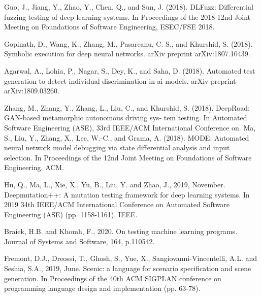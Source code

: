 \begin{singlespace}
\begin{thebibliography}{}
 Guo, J., Jiang, Y., Zhao, Y., Chen, Q., and Sun, J. (2018). DLFuzz: Differential fuzzing testing of deep learning systems. In Proceedings of the 2018 12nd Joint Meeting on Foundations of Software Engineering, ESEC/FSE 2018.

 Gopinath, D., Wang, K., Zhang, M., Pasareanu, C. S., and Khurshid, S. (2018). Symbolic execution for deep neural networks. arXiv preprint arXiv:1807.10439.

 Agarwal, A., Lohia, P., Nagar, S., Dey, K., and Saha, D. (2018). Automated test generation to detect individual discrimination in ai
models. arXiv preprint arXiv:1809.03260.

 Zhang, M., Zhang, Y., Zhang, L., Liu, C., and Khurshid, S. (2018). DeepRoad: GAN-based metamorphic autonomous driving sys- tem testing. In Automated Software Engineering (ASE), 33rd IEEE/ACM International Conference on.
 Ma, S., Liu, Y., Zhang, X., Lee, W.-C., and Grama, A. (2018). MODE: Automated neural network model debugging via state differential analysis and input selection. In Proceedings of the 12nd Joint Meeting on Foundations of Software Engineering. ACM.

Hu, Q., Ma, L., Xie, X., Yu, B., Liu, Y. and Zhao, J., 2019, November. Deepmutation++: A mutation testing framework for deep learning systems. In 2019 34th IEEE/ACM International Conference on Automated Software Engineering (ASE) (pp. 1158-1161). IEEE.

Braiek, H.B. and Khomh, F., 2020. On testing machine learning programs. Journal of Systems and Software, 164, p.110542.


 Fremont, D.J., Dreossi, T., Ghosh, S., Yue, X., Sangiovanni-Vincentelli, A.L. and Seshia, S.A., 2019, June. Scenic: a language for scenario specification and scene generation. In Proceedings of the 40th ACM SIGPLAN conference on programming language design and implementation (pp. 63-78).




\end{thebibliography}
\end{singlespace}
